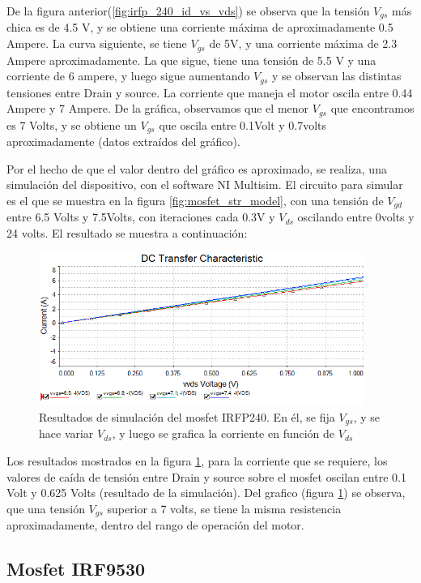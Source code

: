 De la figura anterior(\ref{fig:irfp_240_id_vs_vds}) se observa que la tensión $V_{gs}$ más chica es de 4.5 V, y se obtiene una corriente máxima de aproximadamente 0.5 Ampere. La curva siguiente, se tiene $V_{gs}$ de 5V, y una corriente máxima de 2.3 Ampere aproximadamente. La que sigue, tiene una tensión de 5.5 V y una corriente de 6 ampere, y luego sigue aumentando $V_{gs}$ y se observan las distintas tensiones entre Drain y source. La corriente que maneja el motor oscila entre 0.44 Ampere y 7 Ampere. De la gráfica, observamos que el menor $V_{gs}$ que encontramos es 7 Volts, y se obtiene un $V_{gs}$ que oscila entre 0.1Volt y 0.7volts aproximadamente (datos extraídos del gráfico). 

Por el hecho de que el valor dentro del gráfico es aproximado, se realiza, una simulación del dispositivo, con el software NI Multisim. El circuito para simular es el que se muestra en la figura \ref{fig:mosfet_str_model}, con una tensión de $V_{gd}$ entre 6.5 Volts y 7.5Volts, con iteraciones cada 0.3V y $V_{ds}$ oscilando entre 0volts y 24 volts. El resultado se muestra a continuación:

\begin{figure}[ht!]
	\includegraphics[width=\linewidth,height=5cm]{simul_irfp240} 
	\caption{Resultados de simulación del mosfet IRFP240. En él, se fija $V_{gs}$, y se hace variar $V_{ds}$, y luego se grafica la corriente en función de $V_{ds}$}
	\label{fig:simul_irfp240}
\end{figure}

Los resultados mostrados en la figura \ref{fig:simul_irfp240}, para la corriente que se requiere, los valores de caída de tensión entre Drain y source sobre el mosfet oscilan entre 0.1 Volt y 0.625 Volts (resultado de la simulación). Del grafico (figura \ref{fig:simul_irfp240}) se observa, que una tensión $V_{gs}$ superior a 7 volts, se tiene la misma resistencia aproximadamente, dentro del rango de operación del motor. 


\subsection{Mosfet IRF9530} \label{sub:IRF9530}



